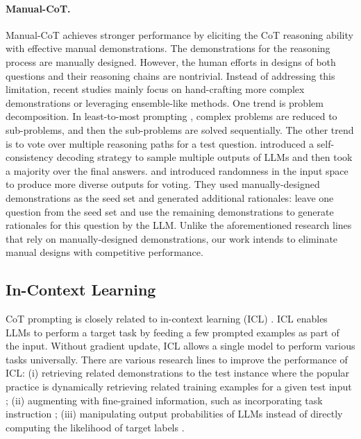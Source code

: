 \paragraph{Manual-CoT.} Manual-CoT achieves stronger performance by eliciting the CoT reasoning ability with effective manual demonstrations. The demonstrations for the reasoning process are manually designed. However, the human efforts in designs of both
questions and their reasoning chains are nontrivial. Instead of addressing this limitation, recent studies mainly focus on hand-crafting more complex demonstrations or leveraging ensemble-like methods. One trend is problem decomposition. In least-to-most prompting \citep{zhou2022least}, complex problems are reduced to sub-problems, and then the sub-problems are solved sequentially. The other trend is to vote over multiple reasoning paths for a test question. \citet{cot_wei_sc} introduced a self-consistency decoding strategy to sample multiple outputs of LLMs and then took a majority over the final answers. \citet{wang2022rationale} and \citet{li2022advance} introduced randomness in the input space to produce more diverse outputs for voting. They used manually-designed demonstrations as the seed set and generated additional rationales: leave one question from the seed set and use the remaining demonstrations to generate rationales for this question by the LLM.
Unlike the aforementioned research lines that rely on manually-designed demonstrations, our work intends to eliminate manual designs with competitive performance.

\subsection{In-Context Learning}
CoT prompting is closely related to in-context learning (ICL) \citep{Radford2019LanguageMA,brown2020language}. ICL enables LLMs to perform a target task by feeding a few prompted examples as part of the input. Without gradient update, ICL allows a single model to perform various tasks universally. There are various research lines to improve the performance of ICL: (i) retrieving related demonstrations to the test instance where the popular practice is dynamically retrieving related training examples for a given test input \citep{rubin2021learning,Su2022SelectiveAM}; (ii) augmenting with fine-grained information, such as incorporating task instruction \citep{mishra2022cross,wei2022finetuned,sanh2022multitask}; (iii) manipulating  output probabilities of LLMs instead of directly computing the likelihood
of target labels \citep{holtzman2021surface,zhao2021calibrate,min2022noisy}.

